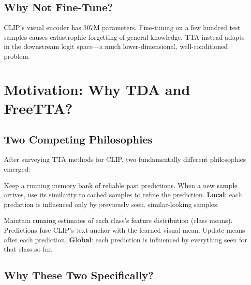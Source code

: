 \documentclass[12pt,a4paper]{article}
\newcommand{\1}{\mathbf{1}}
\begin{document}
\subsection{Why Not Fine-Tune?}

CLIP's visual encoder has 307M parameters.
Fine-tuning on a few hundred test samples causes catastrophic forgetting of general knowledge.
TTA instead adapts in the downstream logit space---a much lower-dimensional, well-conditioned problem.

\section{Motivation: Why TDA and FreeTTA?}

\subsection{Two Competing Philosophies}

After surveying TTA methods for CLIP, two fundamentally different philosophies emerged:

\begin{tcolorbox}[findingbox, title={Philosophy 1 --- ``Remember What You've Seen'' (TDA)}]
  Keep a running memory bank of reliable past predictions.
  When a new sample arrives, use its similarity to cached samples to refine the prediction.
  \textbf{Local}: each prediction is influenced only by previously seen, similar-looking samples.
\end{tcolorbox}

\vspace{0.4em}

\begin{tcolorbox}[findingbox, title={Philosophy 2 --- ``Update Your World Model'' (FreeTTA)}]
  Maintain running estimates of each class's feature distribution (class means).
  Predictions fuse CLIP's text anchor with the learned visual mean.
  Update means after each prediction.
  \textbf{Global}: each prediction is influenced by everything seen for that class so far.
\end{tcolorbox}

\subsection{Why These Two Specifically?}
\end{document}
